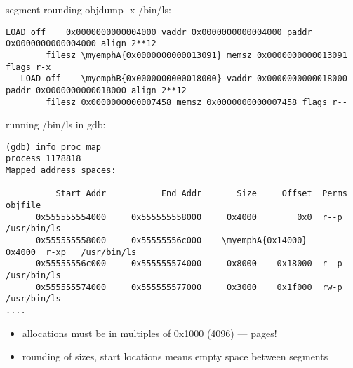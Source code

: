 \begin{frame}[fragile]{segment rounding}
\providecommand{\myemphA}[1]{\myemph<2>{#1}}
\providecommand{\myemphB}[1]{\myemph<3>{#1}}
objdump -x /bin/ls: 
\begin{Verbatim}[fontsize=\fontsize{9}{10},commandchars=\\\{\}]
   LOAD off    0x0000000000004000 vaddr 0x0000000000004000 paddr 0x0000000000004000 align 2**12
        filesz \myemphA{0x0000000000013091} memsz 0x0000000000013091 flags r-x
   LOAD off    \myemphB{0x0000000000018000} vaddr 0x0000000000018000 paddr 0x0000000000018000 align 2**12
        filesz 0x0000000000007458 memsz 0x0000000000007458 flags r--
\end{Verbatim}
running /bin/ls in gdb:
\begin{Verbatim}[fontsize=\fontsize{9}{10},commandchars=\\\{\}]
(gdb) info proc map
process 1178818
Mapped address spaces:

          Start Addr           End Addr       Size     Offset  Perms  objfile
      0x555555554000     0x555555558000     0x4000        0x0  r--p   /usr/bin/ls
      0x555555558000     0x55555556c000    \myemphA{0x14000}     0x4000  r-xp   /usr/bin/ls
      0x55555556c000     0x555555574000     0x8000    0x18000  r--p   /usr/bin/ls
      0x555555574000     0x555555577000     0x3000    0x1f000  rw-p   /usr/bin/ls
....
\end{Verbatim}
\begin{itemize}
\item allocations must be in multiples of 0x1000 (4096) --- pages!
\item rounding of sizes, start locations means empty space between segments
\end{itemize}
\end{frame}
